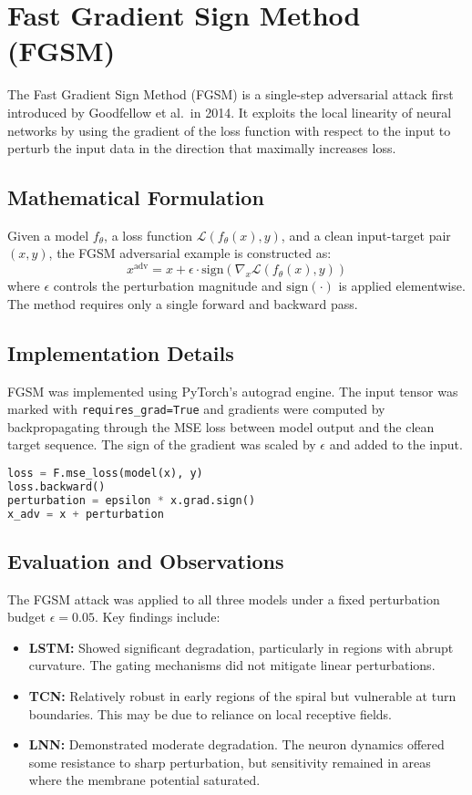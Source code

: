 \section{Fast Gradient Sign Method (FGSM)}

The Fast Gradient Sign Method (FGSM) is a single-step adversarial attack first introduced by Goodfellow et al.\ in 2014. It exploits the local linearity of neural networks by using the gradient of the loss function with respect to the input to perturb the input data in the direction that maximally increases loss.

\subsection{Mathematical Formulation}
Given a model $f_\theta$, a loss function $\mathcal{L}(f_\theta(x), y)$, and a clean input-target pair $(x, y)$, the FGSM adversarial example is constructed as:
\[
x^{\text{adv}} = x + \epsilon \cdot \text{sign} \left( \nabla_x \mathcal{L}(f_\theta(x), y) \right)
\]
where $\epsilon$ controls the perturbation magnitude and $\text{sign}(\cdot)$ is applied elementwise. The method requires only a single forward and backward pass.

\subsection{Implementation Details}
FGSM was implemented using PyTorch's autograd engine. The input tensor was marked with \texttt{requires\_grad=True} and gradients were computed by backpropagating through the MSE loss between model output and the clean target sequence. The sign of the gradient was scaled by $\epsilon$ and added to the input.

\begin{lstlisting}[language=Python, caption={FGSM adversarial attack implementation}]
loss = F.mse_loss(model(x), y)
loss.backward()
perturbation = epsilon * x.grad.sign()
x_adv = x + perturbation
\end{lstlisting}

\subsection{Evaluation and Observations}
The FGSM attack was applied to all three models under a fixed perturbation budget $\epsilon = 0.05$. Key findings include:
\begin{itemize}
    \item \textbf{LSTM:} Showed significant degradation, particularly in regions with abrupt curvature. The gating mechanisms did not mitigate linear perturbations.
    \item \textbf{TCN:} Relatively robust in early regions of the spiral but vulnerable at turn boundaries. This may be due to reliance on local receptive fields.
    \item \textbf{LNN:} Demonstrated moderate degradation. The neuron dynamics offered some resistance to sharp perturbation, but sensitivity remained in areas where the membrane potential saturated.
\end{itemize}

